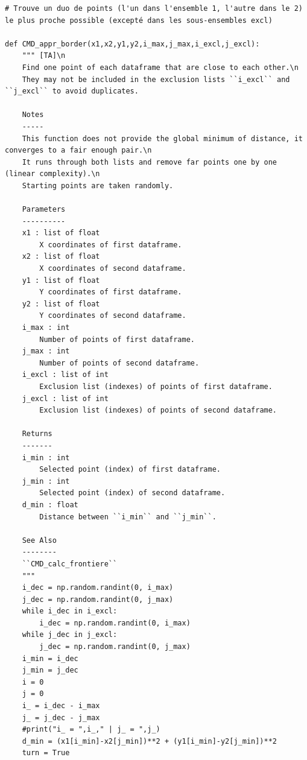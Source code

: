 \documentclass[12pt]{article}
\begin{document}
\begin{lstlisting}
# Trouve un duo de points (l'un dans l'ensemble 1, l'autre dans le 2) le plus proche possible (excepté dans les sous-ensembles excl)

def CMD_appr_border(x1,x2,y1,y2,i_max,j_max,i_excl,j_excl):
    """ [TA]\n
    Find one point of each dataframe that are close to each other.\n
    They may not be included in the exclusion lists ``i_excl`` and ``j_excl`` to avoid duplicates.
    
    Notes
    -----
    This function does not provide the global minimum of distance, it converges to a fair enough pair.\n
    It runs through both lists and remove far points one by one (linear complexity).\n
    Starting points are taken randomly.
    
    Parameters
    ----------
    x1 : list of float
        X coordinates of first dataframe.
    x2 : list of float
        X coordinates of second dataframe.
    y1 : list of float
        Y coordinates of first dataframe.
    y2 : list of float
        Y coordinates of second dataframe.
    i_max : int
        Number of points of first dataframe.
    j_max : int
        Number of points of second dataframe.
    i_excl : list of int
        Exclusion list (indexes) of points of first dataframe.
    j_excl : list of int
        Exclusion list (indexes) of points of second dataframe.
    
    Returns
    -------
    i_min : int
        Selected point (index) of first dataframe.
    j_min : int
        Selected point (index) of second dataframe.
    d_min : float
        Distance between ``i_min`` and ``j_min``.
    
    See Also
    --------
    ``CMD_calc_frontiere``
    """
    i_dec = np.random.randint(0, i_max)
    j_dec = np.random.randint(0, j_max)
    while i_dec in i_excl:
        i_dec = np.random.randint(0, i_max)
    while j_dec in j_excl:
        j_dec = np.random.randint(0, j_max)
    i_min = i_dec
    j_min = j_dec
    i = 0
    j = 0
    i_ = i_dec - i_max
    j_ = j_dec - j_max
    #print("i_ = ",i_," | j_ = ",j_)
    d_min = (x1[i_min]-x2[j_min])**2 + (y1[i_min]-y2[j_min])**2
    turn = True
    

\end{lstlisting}
\end{document}
